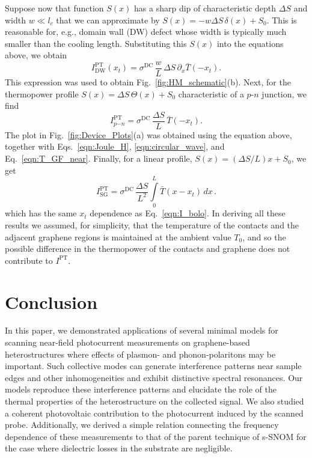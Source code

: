\documentclass[aps, prb, reprint, superscriptaddress]{revtex4-2}
\begin{document}
Suppose now that function $S(x)$ has a sharp dip of characteristic depth $\Delta S$ and width $w \ll l_c$ that we can approximate by $S(x) = -w \Delta S\, \delta(x) + S_0$.
This is reasonable for, e.g., domain wall (DW) defect whose width is typically much smaller than the cooling length. 
Substituting this $S(x)$ into the equations above, we obtain
\begin{equation}
	\label{eqn:I_PC_1D_Dlta}
	I^\mathrm{PT}_\mathrm{DW}(x_t)= \sigma^\mathrm{DC}\,\frac{w}{L}\, \Delta S\, \partial_x \bar{T}(-x_t).
\end{equation}
This expression was used to obtain Fig.~\ref{fig:HM_schematic}(b). 
Next, for the thermopower profile
$S(x) = \Delta S\, \Theta(x) + S_0$
characteristic of a $p$-$n$ junction, we find
\begin{equation}
	I^\mathrm{PT}_{p\mathrm{-}n}= \sigma^\mathrm{DC}\, \frac{\Delta S}{L}\, \bar{T}(-x_t).
	\label{eqn:I_PC_1D_Step}
\end{equation}
The plot in Fig.~\ref{fig:Device_Plots}(a) was obtained using the equation above, together with Eqs.~\eqref{eqn:Joule_H}, \eqref{eqn:circular_wave}, and Eq.~\eqref{eqn:T_GF_near}.
Finally, for a linear profile,
$S(x) = (\Delta S / L) x + S_0$, we get
\begin{equation}
	\label{eqn:I_SG_n_edge}
	I^\mathrm{PT}_\mathrm{SG} = \sigma^\mathrm{DC}\, \frac{\Delta S}{L^2}
	\int\limits_{0}^{L} \bar{T}(x - x_t) \, d x\,.
\end{equation}
which has the same $x_t$ dependence as Eq.~\eqref{eqn:I_bolo}.  
In deriving all these results we assumed, for simplicity, that the temperature of the contacts and the adjacent graphene regions is maintained at the ambient value $T_0$,
and so the possible difference in the thermopower of the contacts and graphene does not contribute to $I^\mathrm{PT}$.

\section{Conclusion}
\label{sec:conclusion}
In this paper, we demonstrated applications of several minimal models for scanning near-field photocurrent measurements
on graphene-based heterostructures where effects of plasmon- and phonon-polaritons may be important.
Such collective modes can generate interference patterns near sample edges and other inhomogeneities and exhibit distinctive spectral resonances.
Our models reproduce these interference patterns and elucidate the role of the thermal properties of the heterostructure on the collected signal.
We also studied a coherent photovoltaic contribution to the photocurrent induced by the scanned probe. 
Additionally, we derived a simple relation connecting the frequency dependence of these measurements to that of the parent technique of s-SNOM for the case where dielectric losses in the substrate are negligible.
\end{document}
